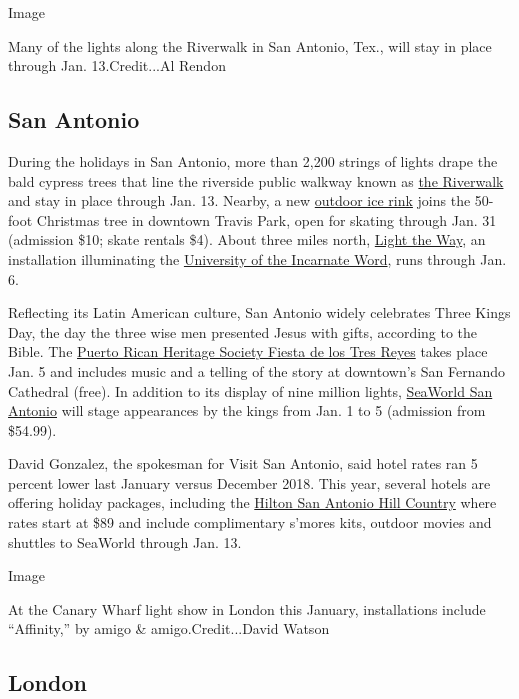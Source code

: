 Image

Many of the lights along the Riverwalk in San Antonio, Tex., will stay
in place through Jan. 13.Credit...Al Rendon

\hypertarget{san-antonio}{%
\subsection{San Antonio}\label{san-antonio}}

During the holidays in San Antonio, more than 2,200 strings of lights
drape the bald cypress trees that line the riverside public walkway
known as
\href{https://www.thesanantonioriverwalk.com/events/holiday-lights-on-the-river-walk1}{the
Riverwalk} and stay in place through Jan. 13. Nearby, a new
\href{http://rotaryicerink.com/}{outdoor ice rink} joins the 50-foot
Christmas tree in downtown Travis Park, open for skating through Jan. 31
(admission \$10; skate rentals \$4). About three miles north,
\href{https://lightthewaysa.com/about/}{Light the Way}, an installation
illuminating the \href{https://lightthewaysa.com/about/}{University of
the Incarnate Word}, runs through Jan. 6.

Reflecting its Latin American culture, San Antonio widely celebrates
Three Kings Day, the day the three wise men presented Jesus with gifts,
according to the Bible. The
\href{http://www.sociedadherenciaprsa.org/}{Puerto Rican Heritage
Society Fiesta de los Tres Reyes} takes place Jan. 5 and includes music
and a telling of the story at downtown's San Fernando Cathedral (free).
In addition to its display of nine million lights,
\href{http://sanantonio.culturemap.com/eventdetail/seaworld-san-antonio-presents-three-kings-day-cele/}{SeaWorld
San Antonio} will stage appearances by the kings from Jan. 1 to 5
(admission from \$54.99).

David Gonzalez, the spokesman for Visit San Antonio, said hotel rates
ran 5 percent lower last January versus December 2018. This year,
several hotels are offering holiday packages, including the
\href{https://www3.hilton.com/en/hotels/texas/hilton-san-antonio-hill-country-SATHCHF/index.html}{Hilton
San Antonio Hill Country} where rates start at \$89 and include
complimentary s'mores kits, outdoor movies and shuttles to SeaWorld
through Jan. 13.

Image

At the Canary Wharf light show in London this January, installations
include ``Affinity,'' by amigo \& amigo.Credit...David Watson

\hypertarget{london}{%
\subsection{London}\label{london}}

